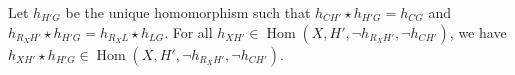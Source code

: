 \begin{lemma}
    \label{lem:1_ex}
                

    Let $h_{H'G}$ be the unique homomorphism such that $h_{CH'} \star h_{H'G} = h_{CG}$ and $h_{R_XH'} \star h_{H'G} = h_{R_XL} \star h_{LG}$. For all $h_{XH'} \in \operatorname{Hom}(X, H', \lnot h_{R_XH'}, \lnot h_{CH'})$, we have $h_{XH'} \star h_{H'G} \in \operatorname{Hom}(X, H', \lnot h_{R_XH'}, \lnot h_{CH'})$.    
\end{lemma}
